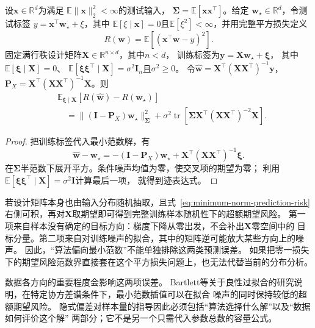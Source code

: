 \begin{theorem}[基于最小范数的回归期望风险]
\label{thm:minimum-norm-risk-decomposition}
设$\bm x\in\mathbb R^d$为满足
$\mathbb E\|\bm x\|_2^2<\infty$的测试输入，
$\bm\Sigma=\mathbb E[\bm x\bm x^\top]$。给定
$\bm w_\star\in\mathbb R^d$，令测试标签
$y=\bm x^\top\bm w_\star+\xi$，其中
$\mathbb E[\xi\mid\bm x]=0$且$\mathbb E[\xi^2]<\infty$，并用完整平方损失定义
\[
 R(\bm w)=\mathbb E[(\bm x^\top\bm w-y)^2].
\]
固定满行秩设计矩阵$\bm X\in\mathbb R^{n\times d}$，其中$n<d$，
训练标签为$\bm y=\bm X\bm w_\star+\bm\xi$，
其中$\mathbb E[\bm\xi\mid\bm X]=0$、
$\mathbb E[\bm\xi\bm\xi^\top\mid\bm X]=\sigma^2\bm I_n$且$\sigma^2\geq0$。
令$\hat{\bm w}=\bm X^\top(\bm X\bm X^\top)^{-1}\bm y$，
$\bm P_X=\bm X^\top(\bm X\bm X^\top)^{-1}\bm X$。则
\begin{equation}
 \begin{aligned}
 &\mathbb E_{\bm\xi\mid\bm X}
       [R(\hat{\bm w})-R(\bm w_\star)]\\
 &\quad=\|(\bm I-\bm P_X)\bm w_\star\|_{\bm\Sigma}^2
 +\sigma^2\operatorname{tr}\left[
 \bm\Sigma\bm X^\top(\bm X\bm X^\top)^{-2}\bm X\right].
 \end{aligned}
 \label{eq:minimum-norm-prediction-risk}
\end{equation}
\end{theorem}
\begin{proof}
把训练标签代入最小范数解，有
\[
 \hat{\bm w}-\bm w_\star
 =-(\bm I-\bm P_X)\bm w_\star
   +\bm X^\top(\bm X\bm X^\top)^{-1}\bm\xi.
\]
在$\bm\Sigma$半范数下展开平方。条件噪声均值为零，使交叉项的期望为零；
利用$\mathbb E[\bm\xi\bm\xi^\top\mid\bm X]=\sigma^2\bm I$计算最后一项，
就得到迹表达式。
\end{proof}

若设计矩阵本身也由输入分布随机抽取，且式~\eqref{eq:minimum-norm-prediction-risk}
右侧可积，再对$\bm X$取期望即可得到完整训练样本随机性下的超额期望风险。
第一项来自样本没有确定的目标方向：梯度下降从零出发，不会补出$\bm X$零空间中的
目标分量。第二项来自对训练噪声的拟合，其中的矩阵逆可能放大某些方向上的噪声。
因此，“算法偏向最小范数”不能单独排除这两类预测误差。
如果把零一损失下的期望风险范数界直接套在这个平方损失问题上，也无法代替当前的分布分析。

数据各方向的重要程度会影响这两项误差。
Bartlett等关于良性过拟合的研究说明，在特定协方差谱条件下，最小范数插值可以在拟合
噪声的同时保持较低的超额期望风险。
隐式偏差对样本量的指导因此必须包括“算法选择什么解”以及“数据如何评价这个解”
两部分；它不是另一个只需代入参数总数的容量公式。

